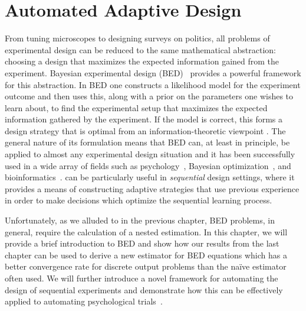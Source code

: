 
\chapter{Automated Adaptive Design}
\label{chp:design}

From tuning microscopes to designing surveys on politics, all problems of 
experimental design can be reduced to the same mathematical abstraction:
choosing a design that maximizes the expected information gained from the 
experiment.
Bayesian experimental design (BED)~\citep{chaloner1995bayesian,sebastiani2000maximum} 
provides a powerful framework for this abstraction.  In BED
one constructs a likelihood model for the experiment outcome and then uses this, along
with a prior on the parameters one wishes to learn about, to find the experimental setup
that maximizes the expected information gathered by the experiment.  
If the model is correct, this forms a design strategy that is optimal from
an information-theoretic viewpoint \citep{sebastiani2000maximum}.  
The general nature of its formulation means that BED can, at least in principle, be applied
to almost any experimental design situation and it has been successfully used in a wide
array of fields such as psychology~\citep{myung2013tutorial,Cavagnaro:discounting,vincent2017darc},
Bayesian optimization~\citep{hennig2012entropy,hernandez2014predictive}, and
bioinformatics~\citep{vanlier2012bayesian}. \Bad can be particularly useful in \emph{sequential}
design settings, where it provides a means of constructing adaptive strategies that use
previous experience in order to make decisions which optimize the sequential learning process.

Unfortunately, as we alluded to in the previous chapter, BED problems, in
general,  require the calculation of a nested estimation.
In this chapter, we will provide a brief introduction to BED and show how our results
from the last chapter can be used to derive a new estimator for BED equations 
which has a better convergence rate for discrete output problems than the na\"{i}ve
estimator often used.  We will further introduce a novel framework for automating the
design of sequential experiments and demonstrate how this can be
effectively applied to automating psychological trials~\citep{vincent2017darc}.  




